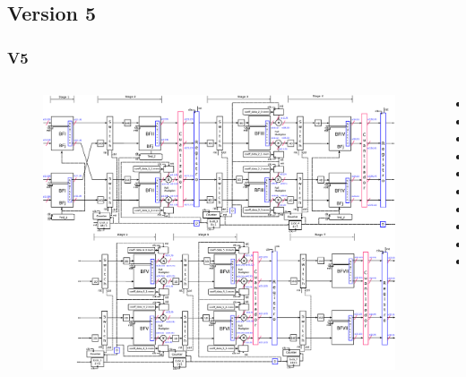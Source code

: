 \documentclass[t]{beamer}
\begin{document}
\subsection{Version 5}

\begin{frame}
\frametitle{V5}	
\begin{columns}[T] %
\begin{column}{.7\textwidth}
\vspace*{-0.8cm}
 \begin{figure}[ht]
    \centering
  \includegraphics[height=0.7\paperheight]{image/V5_esquema_p.eps} \\
    \end{figure}

\end{column}%

\begin{column}{.3\textwidth}


\begin{itemize}
\item
\item
\item
\item
\item
\item
\item
\item
\item
\item
\end{itemize}

\end{column}
\end{columns}

\end{frame}
\end{document}
